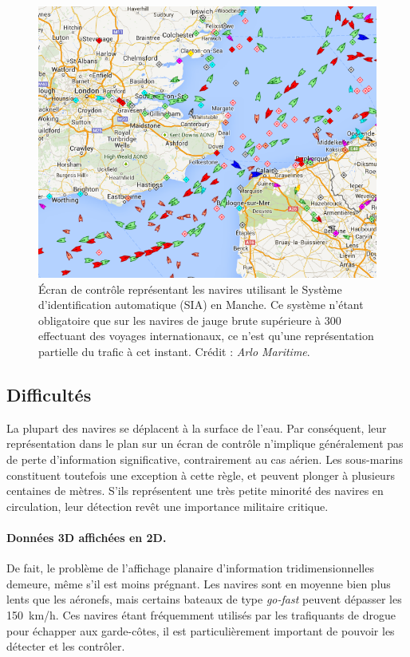 	
	
	\begin{figure}[H]
		\centering
		\includegraphics[width=\textwidth]{figures/ch1/channel}
		\caption[Écran de contrôle maritime en Manche (SIA).]{Écran de contrôle représentant les navires utilisant le Système d'identification automatique (SIA) en Manche. Ce système n'étant obligatoire que sur les navires de jauge brute supérieure à 300 effectuant des voyages internationaux, ce n'est qu'une représentation partielle du trafic à cet instant. Crédit : \emph{Arlo Maritime}\footnotemark.}
		\label{fig:channel}
	\end{figure}
	
	
	\subsection{Difficultés}
	La plupart des navires se déplacent à la surface de l'eau. Par conséquent, leur représentation dans le plan sur un écran de contrôle n'implique généralement pas de perte d'information significative, contrairement au cas aérien. Les sous-marins constituent toutefois une exception à cette règle, et peuvent plonger à plusieurs centaines de mètres. S'ils représentent une très petite minorité des navires en circulation, leur détection revêt une importance militaire critique.
	
	\paragraph{Données 3D affichées en 2D.}
	De fait, le problème de l'affichage planaire d'information tridimensionnelles demeure, même s'il est moins prégnant. Les navires sont en moyenne bien plus lents que les aéronefs, mais certains bateaux de type \emph{go-fast} peuvent dépasser les 150~km/h. Ces navires étant fréquemment utilisés par les trafiquants de drogue pour échapper aux garde-côtes, il est particulièrement important de pouvoir les détecter et les contrôler.
	
